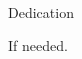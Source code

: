 
\renewcommand{\baselinestretch}{2}
\small\normalsize
\hbox{\ }
 
\vspace{.5in}

\begin{center}
\large{Dedication}
\end{center} 

If needed.
